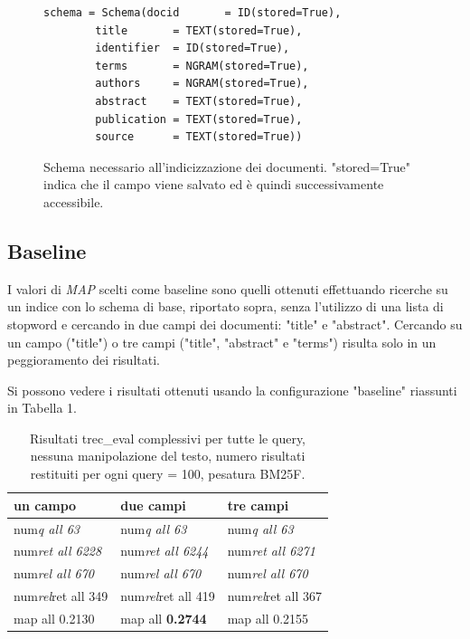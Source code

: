 \documentclass[runningheads]{llncs}
\begin{document}
\begin{figure}
\vspace{-5mm}
\begin{lstlisting}
schema = Schema(docid      	= ID(stored=True),
		title      	= TEXT(stored=True),
		identifier	= ID(stored=True),
		terms 		= NGRAM(stored=True),
		authors		= NGRAM(stored=True),
		abstract 	= TEXT(stored=True),
		publication	= TEXT(stored=True),
		source 		= TEXT(stored=True))
\end{lstlisting}
      \caption{Schema necessario all'indicizzazione dei documenti. "stored=True" indica che il campo viene salvato ed \`e quindi successivamente accessibile. }
      \vspace{-10mm}
\end{figure}




\subsection{Baseline}
I valori di \textit{MAP} scelti come baseline sono quelli ottenuti effettuando ricerche su un indice con lo schema di base, riportato sopra, senza l'utilizzo di una lista di stopword e cercando in due campi dei documenti: "title" e "abstract".
Cercando su un campo ("title") o tre campi ("title", "abstract" e "terms") risulta solo in un peggioramento dei risultati.

Si possono vedere i risultati ottenuti usando la configurazione "baseline" riassunti in Tabella 1.
\par


\begin{table}
\vspace{-3mm}
\centering
\begin{tabular}{lll}
\hline
\textbf{ un campo }           & \textbf{ due campi }           & \textbf{ tre campi }            \\ \hline
 num\textit{q all 63 }       &  num\textit{q all 63 }       &  num\textit{q all 63 }        \\
 num\textit{ret all 6228 }  &  num\textit{ret all 6244 }  &  num\textit{ret all 6271 }   \\
 num\textit{rel all 670 }    &  num\textit{rel all 670 }    &  num\textit{rel all 670 }     \\
 num\textit{rel}ret all 349  &  num\textit{rel}ret all 419  &  num\textit{rel}ret all 367   \\
map all 0.2130               & map all \bf 0.2744               & map all 0.2155 \\ \hline
\end{tabular}

\caption{ Risultati trec\_eval complessivi per tutte le query, nessuna manipolazione del testo, numero risultati restituiti per
ogni query = 100, pesatura BM25F.}
\vspace{-7mm}
\end{table}
\end{document}
